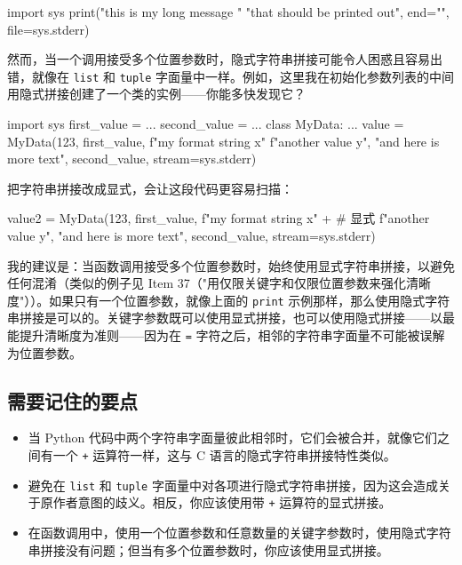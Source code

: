 \begin{codebox}[python]
import sys
print("this is my long message "
      "that should be printed out",
      end="",
      file=sys.stderr)
\end{codebox}

然而，当一个调用接受多个位置参数时，隐式字符串拼接可能令人困惑且容易出错，就像在 \texttt{list} 和 \texttt{tuple} 字面量中一样。例如，这里我在初始化参数列表的中间用隐式拼接创建了一个类的实例——你能多快发现它？

\begin{codebox}[python]
import sys
first_value = ...
second_value = ...
class MyData:
    ...
value = MyData(123,
               first_value,
               f"my format string {x}"
               f"another value {y}",
               "and here is more text",
               second_value,
               stream=sys.stderr)
\end{codebox}

把字符串拼接改成显式，会让这段代码更容易扫描：

\begin{codebox}[python]
value2 = MyData(123,
                first_value,
                f"my format string {x}" +  # 显式
                f"another value {y}",
                "and here is more text",
                second_value,
                stream=sys.stderr)
\end{codebox}

我的建议是：当函数调用接受多个位置参数时，始终使用显式字符串拼接，以避免任何混淆（类似的例子见 Item 37（"用仅限关键字和仅限位置参数来强化清晰度"））。如果只有一个位置参数，就像上面的 \texttt{print} 示例那样，那么使用隐式字符串拼接是可以的。关键字参数既可以使用显式拼接，也可以使用隐式拼接——以最能提升清晰度为准则——因为在 \texttt{=} 字符之后，相邻的字符串字面量不可能被误解为位置参数。

\subsection{需要记住的要点}

\begin{itemize}
\item 当 Python 代码中两个字符串字面量彼此相邻时，它们会被合并，就像它们之间有一个 \texttt{+} 运算符一样，这与 C 语言的隐式字符串拼接特性类似。
\item 避免在 \texttt{list} 和 \texttt{tuple} 字面量中对各项进行隐式字符串拼接，因为这会造成关于原作者意图的歧义。相反，你应该使用带 \texttt{+} 运算符的显式拼接。
\item 在函数调用中，使用一个位置参数和任意数量的关键字参数时，使用隐式字符串拼接没有问题；但当有多个位置参数时，你应该使用显式拼接。
\end{itemize}

